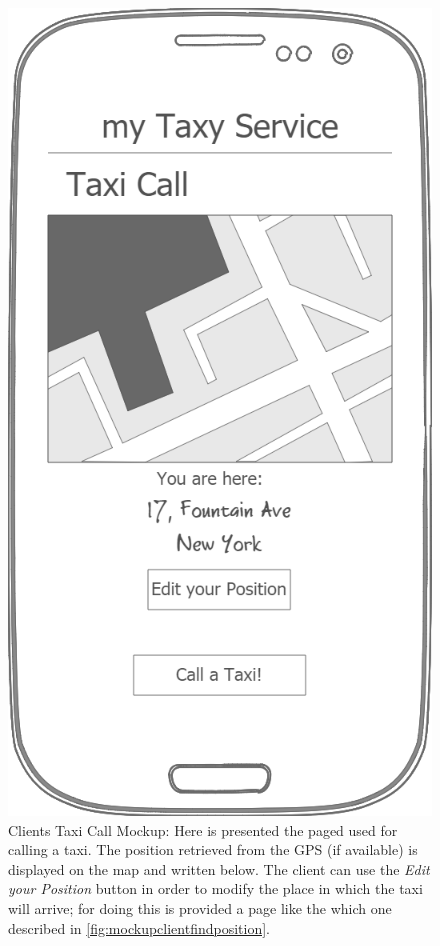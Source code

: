 \documentclass[a4paper]{article}
\begin{document}
\begin{enumerate}[label=\bfseries G\arabic*:]
\begin{figure}[H]
\includegraphics[width=\mockupWidth]{Mockup-ClientsTaxiCall}
\centering
\caption[Clients Taxi Call Mockup]{Clients Taxi Call Mockup: \newline Here is presented the paged used for calling a taxi. The  position retrieved from the GPS (if available) is displayed on the map and written below. The client can use the \emph{Edit your Position} button in order to modify the place in which the taxi will arrive; for doing this is provided a page like the which one described in  \autoref{fig:mockupclientfindposition}.}
\label{fig:mockupclienttaxicall}
\end{figure}


\end{enumerate}
\end{document}
